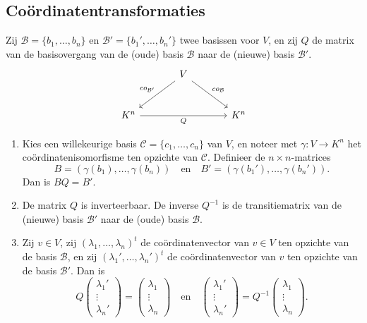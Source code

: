\subsection{Coördinatentransformaties}

\begin{lemma}[4.2.3]
    Zij $\mathcal{B} = \{b_1, \dots, b_n\}$ en $\mathcal{B}' = \{b_1', \dots, b_n'\}$ twee basissen voor $V$,
    en zij $Q$ de matrix van de basisovergang van de (oude) basis $\mathcal{B}$ naar de (nieuwe) basis $\mathcal{B}'$.
    \begin{equation*}
    \begin{tikzcd}[row sep=large, column sep=large]
        & V \arrow[dl, "co_{\mathcal{B}'}"'] \arrow[dr, "co_{\mathcal{B}}"] & \\
        K^n \arrow[rr, "Q"'] & & K^n
    \end{tikzcd}
    \end{equation*}
    \begin{enumerate}
        \item[(i)] Kies een willekeurige basis $\mathcal{C} = \{c_1, \dots, c_n\}$ van $V$,
        en noteer met $\gamma \colon V \to K^n$ het coördinatenisomorfisme ten opzichte van $\mathcal{C}$. Definieer de $n \times n$-matrices
        \[ B = (\gamma(b_1), \dots, \gamma(b_n)) \quad \text{en} \quad B' = (\gamma(b_1'), \dots, \gamma(b_n')). \]
        Dan is $BQ = B'$.
        \item[(ii)] De matrix $Q$ is inverteerbaar. De inverse $Q^{-1}$ is de transitiematrix van de (nieuwe) basis $\mathcal{B}'$ naar de (oude) basis $\mathcal{B}$.
        \item[(iii)] Zij $v \in V$, zij $(\lambda_1, \dots, \lambda_n)^t$ de coördinatenvector van $v \in V$ ten opzichte van de basis $\mathcal{B}$,
        en zij $(\lambda_1', \dots, \lambda_n')^t$ de coördinatenvector van $v$ ten opzichte van de basis $\mathcal{B}'$.
        Dan is \[ Q \begin{pmatrix} \lambda_1' \\ \vdots \\ \lambda_n' \end{pmatrix} = \begin{pmatrix} \lambda_1 \\ \vdots \\ \lambda_n \end{pmatrix} \quad \text{en} \quad \begin{pmatrix} \lambda_1' \\ \vdots \\ \lambda_n' \end{pmatrix} = Q^{-1} \begin{pmatrix} \lambda_1 \\ \vdots \\ \lambda_n \end{pmatrix}. \]
    \end{enumerate}
\end{lemma}
